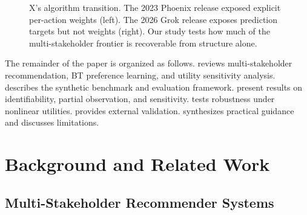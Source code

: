 \documentclass[11pt,letterpaper]{article}
\begin{document}
\begin{figure}[t]
{%
}%
\caption{X's algorithm transition. The 2023 Phoenix release exposed
  explicit per-action weights (left). The 2026 Grok release exposes
  prediction targets but not weights (right). Our study tests how much
  of the multi-stakeholder frontier is recoverable from structure
  alone.}
\label{fig:transition}
\end{figure}

The remainder of the paper is organized as follows.
 reviews multi-stakeholder recommendation, BT
preference learning, and utility sensitivity analysis.
 describes the synthetic benchmark and evaluation
framework. 
present results on identifiability, partial observation, and
sensitivity.  tests
robustness under nonlinear utilities.  provides
external validation.  synthesizes practical
guidance and discusses limitations.

\section{Background and Related Work}
\label{sec:background}

\subsection{Multi-Stakeholder Recommender Systems}
\end{document}
